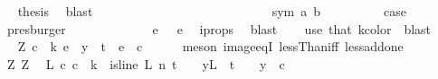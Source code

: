 \begin{isabellebody}
\ \isamarkupfalse%
\ {\isacharquery}{\kern0pt}thesis\ \isamarkupfalse%
\ blast\isanewline
\ \ \ \ \ \ \ \ \isamarkupfalse%
\isanewline
\ \ \ \ \ \ \isamarkupfalse%
\isanewline
\ \ \ \ \isamarkupfalse%
\isanewline
\ \ \ \ \ \ \isamarkupfalse%
\ {\isacharparenleft}{\kern0pt}sym\ a\ b{\isacharparenright}{\kern0pt}\isanewline
\ \ \ \ \ \ \isamarkupfalse%
\ \isamarkupfalse%
\ {\isacharquery}{\kern0pt}case\ \isamarkupfalse%
\ presburger\isanewline
\ \ \ \ \isamarkupfalse%
\isanewline
\ \ \ \ \isamarkupfalse%
\ \isamarkupfalse%
\ {\isachardoublequoteopen}{\isasymchi}\ e{}\ {\isacharequal}{\kern0pt}\ {\isasymchi}\ e{}{\isachardoublequoteclose}\ \isamarkupfalse%
\ i{\isacharunderscore}{\kern0pt}props{\isacharparenleft}{\kern0pt}{}{\isacharcomma}{\kern0pt}{}{\isacharparenright}{\kern0pt}\ \isamarkupfalse%
\ blast\isanewline
\ \ \isamarkupfalse%
\ {\isacharparenleft}{\kern0pt}use\ that{\isacharparenleft}{\kern0pt}{}{\isacharparenright}{\kern0pt}\ k{\isacharunderscore}{\kern0pt}color\ \ blast{\isacharparenright}{\kern0pt}\isanewline
\ \ \isamarkupfalse%
\ \isamarkupfalse%
\ Z{}{\isacharcolon}{\kern0pt}\ {\isachardoublequoteopen}{\isasymexists}c\ {\isacharless}{\kern0pt}\ k{\isachardot}{\kern0pt}\ {\isasymforall}e\ {\isasymin}\ y\ {\isacharbackquote}{\kern0pt}\ {\isacharbraceleft}{\kern0pt}{\isachardot}{\kern0pt}{\isachardot}{\kern0pt}{\isacharless}{\kern0pt}t{\isacharplus}{\kern0pt}{}{\isacharbraceright}{\kern0pt}{\isachardot}{\kern0pt}\ {\isasymchi}\ e\ {\isacharequal}{\kern0pt}\ c{\isachardoublequoteclose}\isanewline
\ \ \ \ \isamarkupfalse%
\ {\isacharparenleft}{\kern0pt}meson\ image{\isacharunderscore}{\kern0pt}eqI\ lessThan{\isacharunderscore}{\kern0pt}iff\ less{\isacharunderscore}{\kern0pt}add{\isacharunderscore}{\kern0pt}one{\isacharparenright}{\kern0pt}\isanewline
\isanewline
\ \ \isamarkupfalse%
\ Z{}\ Z{}\ \isamarkupfalse%
\ {\isachardoublequoteopen}{\isasymexists}L\ c{\isachardot}{\kern0pt}\ c\ {\isacharless}{\kern0pt}\ k\ {\isasymand}\ is{\isacharunderscore}{\kern0pt}line\ L\ n\ {\isacharparenleft}{\kern0pt}t\ {\isacharplus}{\kern0pt}\ {}{\isacharparenright}{\kern0pt}\ {\isasymand}\ {\isacharparenleft}{\kern0pt}{\isasymforall}y{\isasymin}L\ {\isacharbackquote}{\kern0pt}\ {\isacharbraceleft}{\kern0pt}{\isachardot}{\kern0pt}{\isachardot}{\kern0pt}{\isacharless}{\kern0pt}t\ {\isacharplus}{\kern0pt}\ {}{\isacharbraceright}{\kern0pt}{\isachardot}{\kern0pt}\ {\isasymchi}\ y\ {\isacharequal}{\kern0pt}\ c{\isacharparenright}{\kern0pt}{\isachardoublequoteclose}\ \isamarkupfalse%

\end{isabellebody}
